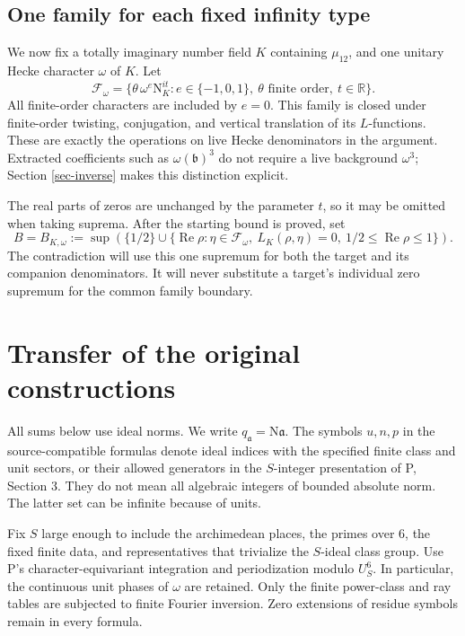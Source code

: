 \documentclass[11pt,a4paper]{article}
\theoremstyle{remark}\newtheorem{remark}[theorem]{Remark}
\newcommand{\N}{\mathrm N}
\newcommand{\Rea}{\operatorname{Re}}
\newcommand{\Packet}{\mathscr F_\omega}
\numberwithin{equation}{section}
\begin{document}
\subsection{One family for each fixed infinity type}

We now fix a totally imaginary number field $K$ containing
$\mu_{12}$, and one unitary Hecke character $\omega$ of $K$.
Let
\begin{equation}\label{eq-packet}
 \Packet=
 \{\theta\,\omega^e\N_K^{it}:
          e\in\{-1,0,1\},\
          \theta\text{ finite order},\ t\in\mathbb R\}.
\end{equation}
All finite-order characters are included by $e=0$. This family is
closed under finite-order twisting, conjugation, and vertical
translation of its $L$-functions. These are exactly the operations
on live Hecke denominators in the argument. Extracted coefficients
such as $\omega(\mathfrak b)^3$ do not require a live background
$\omega^3$; Section \ref{sec-inverse} makes this distinction explicit.

The real parts of zeros are unchanged by the parameter $t$, so
it may be omitted when taking suprema. After the starting bound is
proved, set
\begin{equation}\label{eq-common-B}
 B=B_{K,\omega}:=
 \sup\left(\{1/2\}\cup
   \{\Rea\rho:\eta\in\Packet,\ L_K(\rho,\eta)=0,\
                            1/2\le\Rea\rho\le1\}\right).
\end{equation}
The contradiction will use this one supremum for both the target
and its companion denominators. It will never substitute a
target's individual zero supremum for the common family boundary.

\section{Transfer of the original constructions}\label{sec-inputs}

All sums below use ideal norms. We write $q_{\mathfrak a}=\N\mathfrak a$.
The symbols $u,n,p$ in the source-compatible formulas denote ideal
indices with the specified finite class and unit sectors, or their
allowed generators in the $S$-integer presentation of P, Section 3.
They do not mean all algebraic integers of bounded absolute norm.
The latter set can be infinite because of units.

Fix $S$ large enough to include the archimedean places, the primes
over $6$, the fixed finite data, and representatives that trivialize
the $S$-ideal class group. Use P's character-equivariant integration
and periodization modulo $U_S^6$. In particular, the continuous
unit phases of $\omega$ are retained. Only the finite power-class
and ray tables are subjected to finite Fourier inversion.
Zero extensions of residue symbols remain in every formula.
\end{document}
